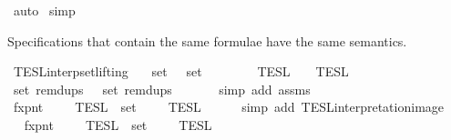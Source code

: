 \begin{isabellebody}
\ auto\isanewline
{}\isamarkupfalse%
\ simp%
\endisatagproof
{\isafoldproof}%
%
\isadelimproof
%
\endisadelimproof
%
\begin{isamarkuptext}%
Specifications that contain the same formulae have the same semantics.%
\end{isamarkuptext}\isamarkuptrue%
\isamarkupfalse%
\ TESL{\isacharunderscore}interp{\isacharunderscore}set{\isacharunderscore}lifting{\isacharcolon}\isanewline
\ \ \ {\isacartoucheopen}set\ {\isasymPhi}\ {\isacharequal}\ set\ {\isasymPhi}{\isacharprime}{\isacartoucheclose}\isanewline
\ \ \ \ \ {\isacartoucheopen}{\isasymlbrakk}{\isasymlbrakk}\ {\isasymPhi}\ {\isasymrbrakk}{\isasymrbrakk}\isactrlsub T\isactrlsub E\isactrlsub S\isactrlsub L\ {\isacharequal}\ {\isasymlbrakk}{\isasymlbrakk}\ {\isasymPhi}{\isacharprime}\ {\isasymrbrakk}{\isasymrbrakk}\isactrlsub T\isactrlsub E\isactrlsub S\isactrlsub L{\isacartoucheclose}\isanewline
%
\isadelimproof
%
\endisadelimproof
%
\isatagproof
{}\isamarkupfalse%
\ {\isacharminus}\ \ \ \ \ \isanewline
\ \ \isamarkupfalse%
\ {\isacartoucheopen}set\ {\isacharparenleft}remdups\ {\isasymPhi}{\isacharparenright}\ {\isacharequal}\ set\ {\isacharparenleft}remdups\ {\isasymPhi}{\isacharprime}{\isacharparenright}{\isacartoucheclose}\isanewline
\ \ \ \ \isamarkupfalse%
\ {\isacharparenleft}simp\ add{\isacharcolon}\ assms{\isacharparenright}\isanewline
\ \ \isamarkupfalse%
\ \isamarkupfalse%
\ fxpnt{\isasymPhi}{\isacharcolon}\ {\isacartoucheopen}{\isasymInter}\ {\isacharparenleft}{\isacharparenleft}{\isasymlambda}{\isasymphi}{\isachardot}\ {\isasymlbrakk}\ {\isasymphi}\ {\isasymrbrakk}\isactrlsub T\isactrlsub E\isactrlsub S\isactrlsub L{\isacharparenright}\ {\isacharbackquote}\ set\ {\isasymPhi}{\isacharparenright}\ {\isacharequal}\ {\isasymlbrakk}{\isasymlbrakk}\ {\isasymPhi}\ {\isasymrbrakk}{\isasymrbrakk}\isactrlsub T\isactrlsub E\isactrlsub S\isactrlsub L{\isacartoucheclose}\isanewline
\ \ \ \ \isamarkupfalse%
\ {\isacharparenleft}simp\ add{\isacharcolon}\ TESL{\isacharunderscore}interpretation{\isacharunderscore}image{\isacharparenright}\isanewline
\ \ \isamarkupfalse%
\ \isamarkupfalse%
\ fxpnt{\isasymPhi}{\isacharprime}{\isacharcolon}\ {\isacartoucheopen}{\isasymInter}\ {\isacharparenleft}{\isacharparenleft}{\isasymlambda}{\isasymphi}{\isachardot}\ {\isasymlbrakk}\ {\isasymphi}\ {\isasymrbrakk}\isactrlsub T\isactrlsub E\isactrlsub S\isactrlsub L{\isacharparenright}\ {\isacharbackquote}\ set\ {\isasymPhi}{\isacharprime}{\isacharparenright}\ {\isacharequal}\ {\isasymlbrakk}{\isasymlbrakk}\ {\isasymPhi}{\isacharprime}\ {\isasymrbrakk}{\isasymrbrakk}\isactrlsub T\isactrlsub E\isactrlsub S\isactrlsub L{\isacartoucheclose}\isanewline

\end{isabellebody}
